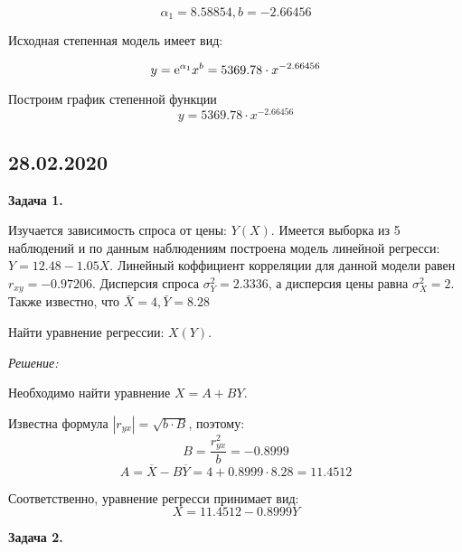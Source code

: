 \documentclass[aps,%
12pt,%
final,%
oneside,
onecolumn,%
musixtex, %
superscriptaddress,%
centertags]{article} %
\begin{document}
$$ \alpha_1 = 8.58854, b = -2.66456 $$

Исходная степенная модель имеет вид:

$$ y = {\rm e}^{\alpha_1}x^b = 5369.78 \cdot x^{-2.66456} $$

Построим график степенной функции $$y= 5369.78 \cdot x^{-2.66456}$$

\begin{center}
\end{center}

\subsection{28.02.2020}

\textbf{Задача 1.}

Изучается зависимость спроса от цены: $Y(X)$. Имеется выборка из 5 наблюдений и по данным наблюдениям построена модель линейной регресси: $Y = 12.48 - 1.05 X$. Линейный коффициент корреляции для данной модели равен $r_{xy} = -0.97206$. Дисперсия спроса $\sigma_Y^2 = 2.3336$, а дисперсия цены равна $\sigma_X^2 = 2$. Также известно, что $\bar{X} = 4,\bar{Y} = 8.28$

Найти уравнение регрессии: $X(Y)$.

\textit{Решение:}

Необходимо найти уравнение $X = A + BY$.

Известна формула $|r_{yx}| = \sqrt{b \cdot B}$, поэтому: $$ B = \frac{r_{yx}^2}{b} = -0.8999$$
$$ A = \overline{X} - B\overline{Y} = 4 + 0.8999 \cdot 8.28 = 11.4512$$

Соответственно, уравнение регресси принимает вид:
$$ X = 11.4512  -0.8999Y$$

\textbf{Задача 2.}
\end{document}
